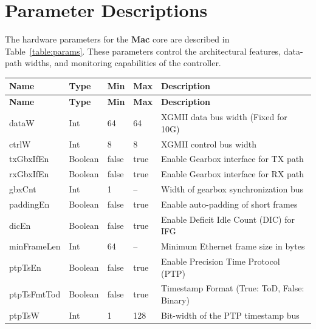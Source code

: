 
\section{Parameter Descriptions}

The hardware parameters for the \textbf{Mac} core are described in Table~\ref{table:params}. These parameters control the architectural features, data-path widths, and monitoring capabilities of the controller.

\renewcommand*{\arraystretch}{1.4}
\begin{longtable}[H]{
    | p{}
    | p{}
    | p{}
    | p{}
    | p{} |
  }
  \hline
  \textbf{Name} & \textbf{Type} & \textbf{Min} & \textbf{Max} & \textbf{Description} \\ \hline \hline
  \endfirsthead
  \hline
  \textbf{Name} & \textbf{Type} & \textbf{Min} & \textbf{Max} & \textbf{Description} \\ \hline \hline
  \endhead

  dataW         & Int     & 64      & 64      & XGMII data bus width (Fixed for 10G) \\ \hline
  ctrlW         & Int     & 8       & 8       & XGMII control bus width \\ \hline
  txGbxIfEn     & Boolean & false   & true    & Enable Gearbox interface for TX path \\ \hline
  rxGbxIfEn     & Boolean & false   & true    & Enable Gearbox interface for RX path \\ \hline
  gbxCnt        & Int     & 1       & --      & Width of gearbox synchronization bus \\ \hline
  
  paddingEn     & Boolean & false   & true    & Enable auto-padding of short frames \\ \hline
  dicEn         & Boolean & false   & true    & Enable Deficit Idle Count (DIC) for IFG \\ \hline
  minFrameLen   & Int     & 64      & --      & Minimum Ethernet frame size in bytes \\ \hline
  
  ptpTsEn       & Boolean & false   & true    & Enable Precision Time Protocol (PTP) \\ \hline
  ptpTsFmtTod   & Boolean & false   & true    & Timestamp Format (True: ToD, False: Binary) \\ \hline
  ptpTsW        & Int     & 1       & 128     & Bit-width of the PTP timestamp bus \\ \hline
  

\end{longtable}
